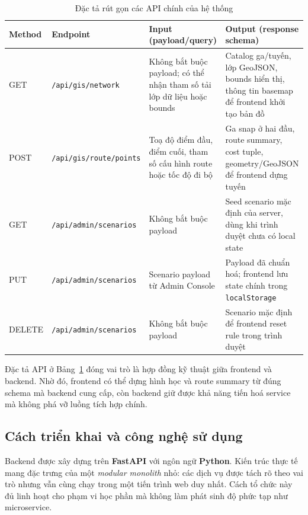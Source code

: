 ﻿\documentclass[../DoAn.tex]{subfiles}
\begin{document}
\begin{table}[H]
\centering
\small
\caption{Đặc tả rút gọn các API chính của hệ thống}
\label{tab:api_spec}
\renewcommand{\arraystretch}{1.25}
\begin{tabular}{|>{\raggedright\arraybackslash}p{1.2cm}|>{\raggedright\arraybackslash}p{4.0cm}|>{\raggedright\arraybackslash}p{4.2cm}|>{\raggedright\arraybackslash}p{4.8cm}|}
\hline
\textbf{Method} & \textbf{Endpoint} & \textbf{Input (payload/query)} & \textbf{Output (response schema)} \\ \hline
GET & \texttt{/api/\allowbreak gis/\allowbreak network} & Không bắt buộc payload; có thể nhận tham số tải lớp dữ liệu hoặc bounds & Catalog ga/tuyến, lớp GeoJSON, bounds hiển thị, thông tin basemap để frontend khởi tạo bản đồ \\ \hline
POST & \texttt{/api/\allowbreak gis/\allowbreak route/\allowbreak points} & Toạ độ điểm đầu, điểm cuối, tham số cấu hình route hoặc tốc độ đi bộ & Ga snap ở hai đầu, route summary, cost tuple, geometry/GeoJSON để frontend dựng tuyến \\ \hline
GET & \texttt{/api/\allowbreak admin/\allowbreak scenarios} & Không bắt buộc payload & Seed scenario mặc định của server, dùng khi trình duyệt chưa có local state \\ \hline
PUT & \texttt{/api/\allowbreak admin/\allowbreak scenarios} & Scenario payload từ Admin Console & Payload đã chuẩn hoá; frontend lưu state chính trong \texttt{localStorage} \\ \hline
DELETE & \texttt{/api/\allowbreak admin/\allowbreak scenarios} & Không bắt buộc payload & Scenario mặc định để frontend reset rule trong trình duyệt \\ \hline
\end{tabular}
\end{table}

Đặc tả API ở Bảng~\ref{tab:api_spec} đóng vai trò là hợp đồng kỹ thuật giữa frontend và backend. Nhờ đó, frontend có thể dựng hình học và route summary từ đúng schema mà backend cung cấp, còn backend giữ được khả năng tiến hoá service mà không phá vỡ luồng tích hợp chính.

\subsection{Cách triển khai và công nghệ sử dụng}
Backend được xây dựng trên \textbf{FastAPI} với ngôn ngữ \textbf{Python}. Kiến trúc thực tế mang đặc trưng của một \textit{modular monolith} nhỏ: các dịch vụ được tách rõ theo vai trò nhưng vẫn cùng chạy trong một tiến trình web duy nhất. Cách tổ chức này đủ linh hoạt cho phạm vi học phần mà không làm phát sinh độ phức tạp như microservice.
\end{document}
